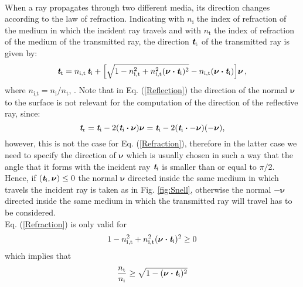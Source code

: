 \\ When a ray propagates through two different media, its direction changes according to the law of refraction. 
Indicating with $n_\textrm{i}$ the index of refraction of the medium in which the incident ray travels and with 
$n_\textrm{t}$ the index of refraction of the medium of the transmitted ray, the direction $\textit{\textbf{t}}_\textrm{t}$ of the transmitted ray is given by:
\begin{equation}\label{Refraction}
\textit{\textbf{t}}_\textrm{t} = n_{\textrm{i},\textrm{t}}\,\textit{\textbf{t}}_\textrm{i}+
\Big[\sqrt{1-n_{\textrm{i},\textrm{t}}^2+
n_{\textrm{i},\textrm{t}}^2(\boldsymbol{\nu}\boldsymbol{\cdot}\textit{\textbf{t}}_\textrm{i})^2}
-n_{\textrm{i},\textrm{t}}(\boldsymbol{\nu}\boldsymbol{\cdot}\textit{\textbf{t}}_\textrm{i}) \Big]\boldsymbol{\nu}\,,
\end{equation}
where $n_{\textrm{i},\textrm{t}}=n_\textrm{i}/n_\textrm{t}$, \cite{chaves2015introduction}.
 Note that in Eq. (\ref{Reflection}) the direction of the normal $\boldsymbol{\nu}$ to the surface is not relevant for the computation of the direction of the reflective ray, since:
\begin{equation}
\textit{\textbf{t}}_\textrm{r} = \textit{\textbf{t}}_\textrm{i}-2(\textit{\textbf{t}}_\textrm{i}\boldsymbol{\cdot}\boldsymbol{\nu})\boldsymbol{\nu}= \textit{\textbf{t}}_\textrm{i}-2(\textit{\textbf{t}}_\textrm{i}\boldsymbol{\cdot}-\boldsymbol{\nu})(-\boldsymbol{\nu}) ,
\end{equation}
however, this is not the case for Eq. (\ref{Refraction}), therefore in the latter case we need to specify the direction of $\boldsymbol{\nu}$ which is usually chosen in such a way that the angle that it forms with the incident ray $\textit{\textbf{t}}_\textrm{i}$ is smaller than or equal to $\pi/2$. Hence, if $(\textit{\textbf{t}}_\textrm{i}, \boldsymbol{\nu})\leq0$ the normal $\boldsymbol{\nu}$ directed inside the same medium in which travels the incident ray is taken as in Fig. \ref{fig:Snell}, 
otherwise the normal $-\boldsymbol{\nu}$ directed inside the same medium in which the transmitted ray will travel has to be considered.
\\\indent
Eq. (\ref{Refraction}) is only valid for 
\begin{equation}\label{tir}
1-n_{\textrm{i},\textrm{t}}^2+n_{\textrm{i},\textrm{t}}^2(\boldsymbol{\nu}\boldsymbol{\cdot}\textit{\textbf{t}}_\textrm{i})^2\geq 0 
\end{equation} which implies that
\begin{equation}
\frac{n_\textrm{t}}{n_\textrm{i}}\geq \sqrt{1-(\boldsymbol{\nu}\boldsymbol{\cdot}\textit{\textbf{t}}_\textrm{i})^2}
\end{equation}
